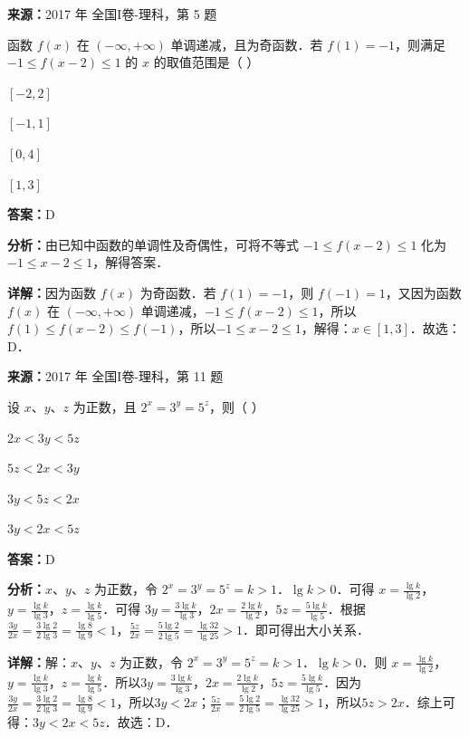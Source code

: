 \begin{question}[points=5]
\textbf{来源：}2017 年 全国I卷-理科，第 5 题\par
函数 $f(x)$ 在 $(-\infty,+\infty)$ 单调递减，且为奇函数．若 $f(1)=-1$，则满足 $-1\leq f(x-2)\leq 1$ 的 $x$ 的取值范围是（ ）
\begin{choices}
  \item $[-2,2]$
  \item $[-1,1]$
  \item $[0,4]$
  \item $[1,3]$
\end{choices}
\begin{solution}
\textbf{答案：}D

\textbf{分析：}由已知中函数的单调性及奇偶性，可将不等式 $-1\leq f(x-2)\leq 1$ 化为 $-1\leq x-2\leq 1$，解得答案．

\textbf{详解：}因为函数 $f(x)$ 为奇函数．若 $f(1)=-1$，则 $f(-1)=1$，又因为函数 $f(x)$ 在 $(-\infty,+\infty)$ 单调递减，$-1\leq f(x-2)\leq 1$，所以$f(1)\leq f(x-2)\leq f(-1)$，所以$-1\leq x-2\leq 1$，解得：$x\in[1,3]$．故选：D．
\end{solution}
\end{question}

\begin{question}[points=5]
\textbf{来源：}2017 年 全国I卷-理科，第 11 题\par
设 $x$、$y$、$z$ 为正数，且 $2^x=3^y=5^z$，则（ ）
\begin{choices}
  \item $2x<3y<5z$
  \item $5z<2x<3y$
  \item $3y<5z<2x$
  \item $3y<2x<5z$
\end{choices}
\begin{solution}
\textbf{答案：}D

\textbf{分析：}$x$、$y$、$z$ 为正数，令 $2^x=3^y=5^z=k>1$．$\lg k>0$．可得 $x=\frac{\lg k}{\lg 2}$，$y=\frac{\lg k}{\lg 3}$，$z=\frac{\lg k}{\lg 5}$．可得 $3y=\frac{3\lg k}{\lg 3}$，$2x=\frac{2\lg k}{\lg 2}$，$5z=\frac{5\lg k}{\lg 5}$．根据 $\frac{3y}{2x}=\frac{3\lg 2}{2\lg 3}=\frac{\lg 8}{\lg 9}<1$，$\frac{5z}{2x}=\frac{5\lg 2}{2\lg 5}=\frac{\lg 32}{\lg 25}>1$．即可得出大小关系．

\textbf{详解：}解：$x$、$y$、$z$ 为正数，令 $2^x=3^y=5^z=k>1$．$\lg k>0$．则 $x=\frac{\lg k}{\lg 2}$，$y=\frac{\lg k}{\lg 3}$，$z=\frac{\lg k}{\lg 5}$．所以$3y=\frac{3\lg k}{\lg 3}$，$2x=\frac{2\lg k}{\lg 2}$，$5z=\frac{5\lg k}{\lg 5}$．因为$\frac{3y}{2x}=\frac{3\lg 2}{2\lg 3}=\frac{\lg 8}{\lg 9}<1$，所以$3y<2x$；$\frac{5z}{2x}=\frac{5\lg 2}{2\lg 5}=\frac{\lg 32}{\lg 25}>1$，所以$5z>2x$．综上可得：$3y<2x<5z$．故选：D．
\end{solution}
\end{question}

